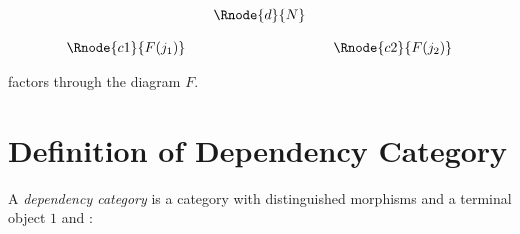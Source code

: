 \documentclass[10pt,a4paper]{scrartcl}
\begin{document}
\begin{center}
\begin{equation}
\begin{array}{cp{0cm}cp{0cm} c}
            & &\Rnode{d}{N}                           \\ [0.4cm]
\Rnode{c1}{F(j_1)}& &                & & \Rnode{c2}{F(j_2)} 
\end{array}
\end{equation}
\end{center}

factors through the diagram $F$.

\section{Definition of Dependency Category}
A \textit{dependency category} is a category  with distinguished morphisms and a terminal object $1$ and :
\end{document}
